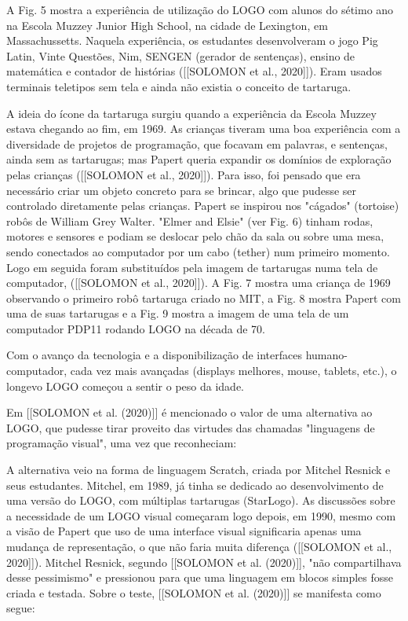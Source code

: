 A Fig. 5 mostra a experiência de utilização do LOGO com alunos do sétimo ano na Escola Muzzey Junior High School, na cidade de Lexington, em Massachussetts. Naquela experiência, os estudantes desenvolveram o jogo Pig Latin, Vinte Questões, Nim, SENGEN (gerador de sentenças), ensino de matemática e contador de histórias  ([[SOLOMON et al., 2020]]). Eram usados terminais teletipos sem tela e ainda não existia o conceito de tartaruga.

A ideia do ícone da tartaruga surgiu quando a experiência da Escola Muzzey estava chegando ao fim, em 1969. As crianças tiveram uma boa experiência com a diversidade de projetos de programação, que focavam em palavras, e sentenças, ainda sem as tartarugas; mas Papert queria expandir os domínios de exploração pelas crianças ([[SOLOMON et al., 2020]]). Para isso, foi pensado que era necessário criar um objeto concreto para se brincar, algo que pudesse ser controlado diretamente pelas crianças. Papert se inspirou nos "cágados"  (tortoise) robôs de William Grey Walter. "Elmer and Elsie" (ver Fig. 6) tinham rodas, motores e sensores e podiam se deslocar pelo chão da sala ou sobre uma mesa, sendo conectados ao computador por um cabo (tether) num primeiro momento. Logo em seguida foram substituídos pela imagem de tartarugas numa tela de computador, ([[SOLOMON et al., 2020]]). A Fig. 7 mostra uma criança de 1969 observando o primeiro robô tartaruga criado no MIT, a Fig. 8 mostra Papert com uma de suas tartarugas e a Fig. 9 mostra a imagem de uma tela de um computador PDP11 rodando LOGO na década de 70.

Com o avanço da tecnologia e a disponibilização de interfaces humano-computador, cada vez mais avançadas (displays melhores, mouse, tablets, etc.), o longevo LOGO começou a sentir o peso da idade.

Em [[SOLOMON et al. (2020)]] é mencionado o valor de uma alternativa ao LOGO, que pudesse tirar proveito das virtudes das chamadas "linguagens de programação visual", uma vez que reconheciam:


\noindent\begin{center}\mbox{\centering{}}\end{center}


A alternativa veio na forma de linguagem Scratch, criada por Mitchel Resnick e seus estudantes. Mitchel, em 1989, já tinha se dedicado ao desenvolvimento de uma versão do LOGO, com múltiplas tartarugas (StarLogo). As discussões sobre a necessidade de um  LOGO visual começaram logo depois, em 1990, mesmo com a visão de Papert que uso de uma interface visual significaria apenas uma mudança de representação, o que não faria muita diferença   ([[SOLOMON et al., 2020]]). Mitchel Resnick, segundo  [[SOLOMON et al. (2020)]], "não compartilhava desse pessimismo" e pressionou para que uma linguagem em blocos simples fosse criada e testada. Sobre o teste,  [[SOLOMON et al. (2020)]] se manifesta como segue:


